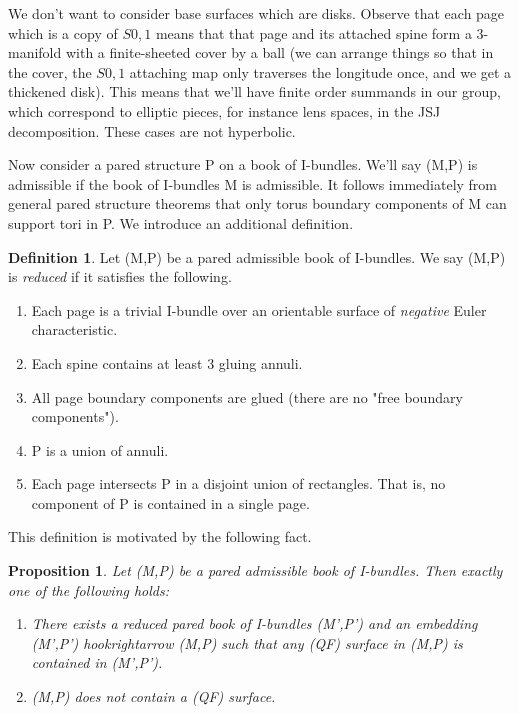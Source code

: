 \documentclass[12pt]{amsart}
\newtheorem{prop}[theorem]{Proposition}
\theoremstyle{definition}
\newtheorem{defn}[theorem]{Definition}
\theoremstyle{remark}
\begin{document}
We don't want to consider base surfaces which are disks. Observe that each page
which is a copy of $S0,1$ means that that page and its attached spine form
a 3-manifold with a finite-sheeted cover by a ball (we can arrange things so
that in the cover, the $S0,1$ attaching map only traverses the longitude once,
and we get a thickened disk).  This means that we'll have finite order summands
in our group, which correspond to elliptic pieces, for instance lens spaces, in
the JSJ decomposition. These cases are not hyperbolic.

Now consider a pared structure P on a book of I-bundles. We'll say (M,P) is
admissible if the book of I-bundles M is admissible. It follows immediately
from general pared structure theorems that only torus boundary components of
M can support tori in P. We introduce an additional definition.

\begin{defn}

Let (M,P) be a pared admissible book of I-bundles. We say (M,P) is
\emph{reduced} if it satisfies the following.

\begin{enumerate}

\item Each page is a trivial I-bundle over an orientable surface of
\emph{negative} Euler characteristic.

\item Each spine contains at least $3$ gluing annuli.

\item All page boundary components are glued (there are no "free boundary
components").

\item P is a union of annuli.

\item Each page intersects P in a disjoint union of rectangles. That is, no
component of P is contained in a single page.

\end{enumerate}

\end{defn}

This definition is motivated by the following fact.

\begin{prop}

Let (M,P) be a pared admissible book of I-bundles. Then exactly one of the
following holds:

\begin{enumerate}

\item There exists a reduced pared book of I-bundles (M',P') and an embedding
(M',P') hookrightarrow (M,P) such that any (QF) surface in (M,P) is contained
in (M',P').

\item (M,P) does not contain a (QF) surface.

\end{enumerate}

\end{prop}
\end{document}
